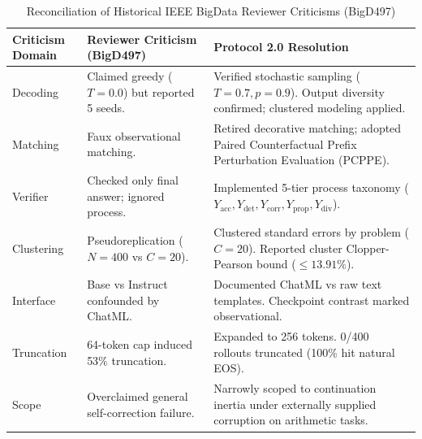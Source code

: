 \documentclass[11pt,letterpaper]{article}
\begin{document}
\begin{table}[t]
\centering
\small
\caption{Reconciliation of Historical IEEE BigData Reviewer Criticisms (BigD497)}
\label{tab:app_reconciliation}
\begin{tabularx}{\textwidth}{p{3.2cm}p{4.8cm}X}
\toprule
\textbf{Criticism Domain} & \textbf{Reviewer Criticism (BigD497)} & \textbf{Protocol 2.0 Resolution} \\
\midrule
Decoding & Claimed greedy ($T=0.0$) but reported 5 seeds. & Verified stochastic sampling ($T=0.7, p=0.9$). Output diversity confirmed; clustered modeling applied. \\
Matching & Faux observational matching. & Retired decorative matching; adopted Paired Counterfactual Prefix Perturbation Evaluation (PCPPE). \\
Verifier & Checked only final answer; ignored process. & Implemented 5-tier process taxonomy ($Y_{\text{acc}}, Y_{\text{det}}, Y_{\text{corr}}, Y_{\text{prop}}, Y_{\text{div}}$). \\
Clustering & Pseudoreplication ($N=400$ vs $C=20$). & Clustered standard errors by problem ($C=20$). Reported cluster Clopper-Pearson bound ($\le 13.91\%$). \\
Interface & Base vs Instruct confounded by ChatML. & Documented ChatML vs raw text templates. Checkpoint contrast marked observational. \\
Truncation & 64-token cap induced 53\% truncation. & Expanded to 256 tokens. 0/400 rollouts truncated (100\% hit natural EOS). \\
Scope & Overclaimed general self-correction failure. & Narrowly scoped to continuation inertia under externally supplied corruption on arithmetic tasks. \\
\bottomrule
\end{tabularx}
\end{table}
\end{document}
